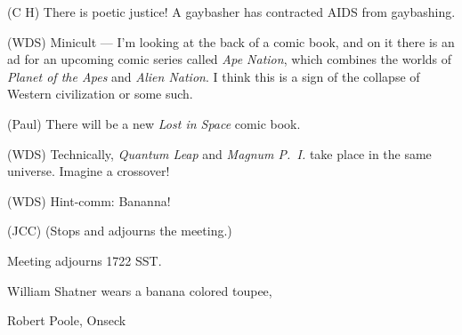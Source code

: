 (C H) There is poetic justice!
A gaybasher has contracted AIDS from gaybashing.

(WDS) Minicult --- I'm looking at the back of a comic book, and on it there
is an ad for an upcoming comic series called {\em Ape Nation}, which combines
the worlds of {\em Planet of the Apes\/} and {\em Alien Nation}.  I think this
is a sign of the collapse of Western civilization or some such.

(Paul) There will be a new {\em Lost in Space\/} comic book.

(WDS) Technically, {\em Quantum Leap\/} and {\em Magnum P.~I.\/} take place
in the same universe.  Imagine a crossover!

(WDS) Hint-comm: Bananna!

(JCC) (Stops and adjourns the meeting.)

Meeting adjourns 1722 SST.

\vspace{0.15in}
\begin{center}
William Shatner wears a banana colored toupee,

Robert Poole, Onseck
\end{center}


